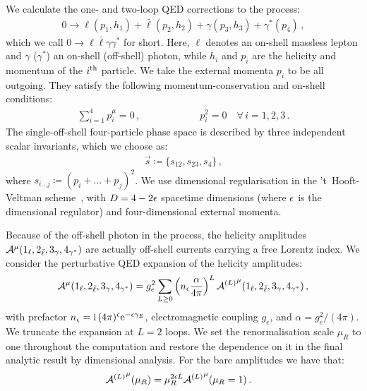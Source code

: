 \documentclass[main.tex]{subfiles}
\begin{document}
We calculate the one- and two-loop \ac{QED} corrections to the process:
\begin{align}
    \label{eqQED:scatter}
    0 \to \ell(p_1,h_1) + \bar{\ell}(p_2,h_2) + \gamma(p_3,h_3) + \gamma^{*}(p_4) \,,
\end{align}
which we call $0\to \ell \bar\ell \gamma \gamma^*$ for short. 
Here, $\ell$ denotes an on-shell massless lepton and $\gamma$ ($\gamma^*$) an on-shell (off-shell) photon, while $h_i$ and $p_i$ are the helicity and momentum of the $i\textsuperscript{th}$ particle.
We take the external momenta $p_i$ to be all outgoing. They satisfy the following momentum-conservation and on-shell conditions:
\begin{align}
    \sum_{i=1}^{4} p_i^\mu = 0 \,, \qquad \qquad \qquad p_i^2 = 0 \quad \forall \, i=1,2,3\,.
\end{align}
The single-off-shell four-particle phase space is described by three independent scalar invariants, which we choose as:
\begin{align}
    \vec{s} \coloneqq \{s_{12}, s_{23}, s_4\} \,,
\end{align}
where $s_{i\ldots j} \coloneqq (p_i+\ldots+p_j)^2$.
We use dimensional regularisation in the 't~Hooft-Veltman scheme~\cite{Gnendiger:2017pys}, with $D=4-2\epsilon$ spacetime dimensions (where $\epsilon$ is the dimensional regulator) and four-dimensional external momenta.

Because of the off-shell photon in the process, the helicity amplitudes $\mathcal{A}^{\mu}(1_\ell,2_{\bar\ell},3_\gamma,4_{\gamma^*})$ are actually off-shell currents carrying a free Lorentz index.
We consider the perturbative \ac{QED} expansion of the helicity amplitudes:
\begin{align} \label{eqQED:loopdecomp}
    \mathcal{A}^{\mu}(1_\ell,2_{\bar\ell},3_\gamma,4_{\gamma^*}) = g_e^2 \sum_{L\ge 0} \left( n_\epsilon \frac{\alpha}{4\pi} \right)^L {\mathcal{A}^{(L)}}^{\mu}(1_\ell,2_{\bar\ell},3_\gamma,4_{\gamma^*}) \,,
\end{align}
with prefactor $n_\epsilon=\mathrm{i}\, (4\pi)^\epsilon \mathrm{e}^{-\epsilon\gamma_E}$, electromagnetic coupling $g_e$, and $\alpha=g_e^2/(4\pi)$.
We truncate the expansion at $L=2$ loops.
We set the renormalisation scale $\mu_R$ to one throughout the computation and restore the dependence on it in the final analytic result by dimensional analysis. For the bare amplitudes we have that:
\begin{align}
    \label{eqQED:scale-restoration}
    {\mathcal{A}^{(L)}}^{\mu}(\mu_R) &= \mu_R^{2\epsilon L} {\mathcal{A}^{(L)}}^{\mu}(\mu_R=1) \,.
\end{align}
\end{document}

